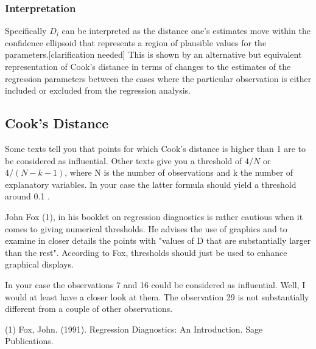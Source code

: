 \documentclass[Main.tex]{subfiles}
\begin{document}
	
	\subsubsection{Interpretation}
	Specifically $D_i$ can be interpreted as the distance one's estimates move within the confidence ellipsoid that represents a region of plausible values for the parameters.[clarification needed] This is shown by an alternative but equivalent representation of Cook's distance in terms of changes to the estimates of the regression parameters between the cases where the particular observation is either included or excluded from the regression analysis.
	
	\newpage
	
	
	\subsection{Cook's Distance}
	Some texts tell you that points for which Cook's distance is higher than 1 are to be considered as influential. Other texts give you a threshold of $4/N$ or $4/(N−k−1)$, where N is the number of observations and k the number of explanatory variables. In your case the latter formula should yield a threshold around 0.1 .
	
	John Fox (1), in his booklet on regression diagnostics is rather cautious when it comes to giving numerical thresholds. He advises the use of graphics and to examine in closer details the points with "values of D that are substantially larger than the rest". According to Fox, thresholds should just be used to enhance graphical displays.
	
	In your case the observations 7 and 16 could be considered as influential. Well, I would at least have a closer look at them. The observation 29 is not substantially different from a couple of other observations.
	
	(1) Fox, John. (1991). Regression Diagnostics: An Introduction. Sage Publications.

\end{document}
